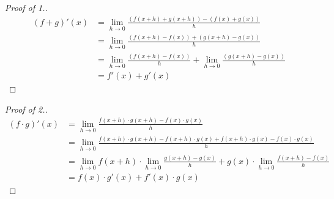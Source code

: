 \documentclass[12pt]{report}
\begin{document}
    \label{Addition of derivatives}
    \begin{proof}[Proof of \textnormal{1.}]
        \begin{align*}
            \left(f + g\right)' (x) &= \lim_{h \to 0} \frac{\left(f(x+h) + g(x+h)\right) - \left(f(x) + g(x)\right)}{h}\\
            &= \lim_{h \to 0} \frac{\left(f(x+h) - f(x)\right) + \left( g(x+h) - g(x)\right)}{h}\\
            &= \lim_{h \to 0} \frac{\left(f(x+h) - f(x)\right)}{h} + \lim_{h \to 0} \frac{\left(g(x+h) - g(x)\right)}{h}\\
            &= f'(x) + g'(x)
        \end{align*}
    \end{proof}
    \label{Multiplication of derivatives}
    \begin{proof}[Proof of \textnormal{2.}]
        \begin{align*}
            \left(f\cdot g\right)'(x) &= \lim_{h \to 0} \frac{f(x+h)\cdot g(x+h) - f(x) \cdot g(x)}{h}\\
            &= \lim_{h \to 0} \frac{f(x+h)\cdot g(x+h) - f(x+h)\cdot g(x) + f(x+h)\cdot g(x) - f(x) \cdot g(x)}{h}\\
            &= \lim_{h \to 0} f(x+h) \cdot \lim_{h \to 0} \frac{g(x+h) - g(x)}{h} + g(x) \cdot \lim_{h \to 0} \frac{f(x+h)- f(x)}{h}\\
            &= f(x) \cdot g'(x) + f'(x)\cdot g(x)
        \end{align*}
    \end{proof}
    \label{Division of derivatives}
\end{document}
